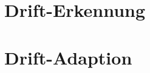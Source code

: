 \section{Drift-Erkennung} \label{sec:mill_detection}
%
\section{Drift-Adaption} \label{sec:mill_adaption}
